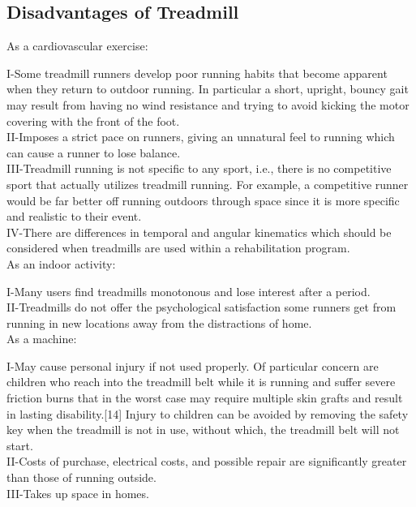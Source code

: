 \documentclass[12pt]{article}
\begin{document}
\subsection{Disadvantages of Treadmill}
As a cardiovascular exercise:

I-Some treadmill runners develop poor running habits that become apparent when they return to outdoor running. In particular a short, upright, bouncy gait may result from having no wind resistance and trying to avoid kicking the motor covering with the front of the foot.\\
II-Imposes a strict pace on runners, giving an unnatural feel to running which can cause a runner to lose balance.\\
III-Treadmill running is not specific to any sport, i.e., there is no competitive sport that actually utilizes treadmill running. For example, a competitive runner would be far better off running outdoors through space since it is more specific and realistic to their event.\\
IV-There are differences in temporal and angular kinematics which should be considered when treadmills are used within a rehabilitation program.\\
As an indoor activity:

I-Many users find treadmills monotonous and lose interest after a period.\\
II-Treadmills do not offer the psychological satisfaction some runners get from running in new locations away from the distractions of home.\\
As a machine:

I-May cause personal injury if not used properly. Of particular concern are children who reach into the treadmill belt while it is running and suffer severe friction burns that in the worst case may require multiple skin grafts and result in lasting disability.[14] Injury to children can be avoided by removing the safety key when the treadmill is not in use, without which, the treadmill belt will not start.\\
II-Costs of purchase, electrical costs, and possible repair are significantly greater than those of running outside.\\
III-Takes up space in homes.\\
\end{document}
